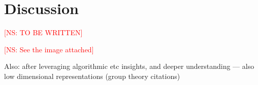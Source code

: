 \documentclass[prodmode,acmec]{ec-acmsmall}
\newcommand{\kibitz}[2]{\ifnum\Comments=1\textcolor{#1}{#2}\fi}
\newcommand{\ns}[1]{\kibitz{red} {[NS: #1]}}
\begin{document}
\section{Discussion}
\label{sec:disc}

\ns{TO BE WRITTEN}

\ns{See the image attached}

Also: after leveraging algorithmic etc insights, and deeper understanding --- also low dimensional representations (group theory citations)






\end{document}
